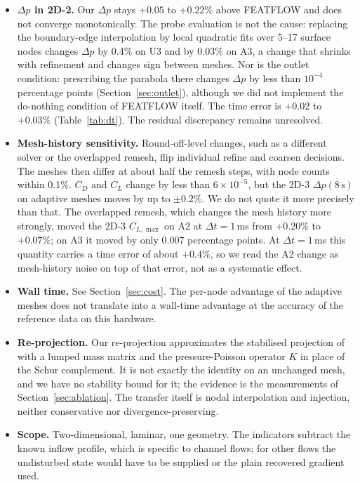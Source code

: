 \documentclass[preprint,12pt,number]{elsarticle}
\newcommand{\dt}{\Delta t}
\begin{document}
\begin{itemize}
\item \textbf{$\Delta p$ in 2D-2.} Our $\Delta p$ stays $+0.05$ to $+0.22\%$ above FEATFLOW
  and does not converge monotonically. The probe evaluation is not the cause: replacing the
  boundary-edge interpolation by local quadratic fits over 5--17 surface nodes changes $\Delta p$
  by 0.4\% on U3 and by 0.03\% on A3, a change that shrinks with refinement and changes sign
  between meshes. Nor is the outlet condition: prescribing the parabola there changes
  $\Delta p$ by less than $10^{-4}$ percentage points (Section~\ref{sec:outlet}), although we
  did not implement the do-nothing condition of FEATFLOW itself. The time error is $+0.02$ to
  $+0.03\%$ (Table~\ref{tab:dt}). The residual discrepancy remains unresolved.
\item \textbf{Mesh-history sensitivity.} Round-off-level changes, such as a different solver
  or the overlapped remesh, flip individual refine and coarsen decisions. The meshes then
  differ at about half the remesh steps, with node counts within 0.1\%. $C_D$ and $C_L$ change
  by less than $6\times10^{-5}$, but the 2D-3 $\Delta p(8\,\mathrm{s})$ on adaptive meshes
  moves by up to $\pm0.2\%$. We do not quote it more precisely than that. The overlapped
  remesh, which changes the mesh history more strongly, moved the 2D-3 $C_{L,\max}$ on A2 at
  $\dt = 1\,$ms from $+0.20\%$ to $+0.07\%$; on A3 it moved by only 0.007 percentage points.
  At $\dt = 1\,$ms this quantity carries a time error of about $+0.4\%$, so we read the A2 change
  as mesh-history noise on top of that error, not as a systematic effect.
\item \textbf{Wall time.} See Section~\ref{sec:cost}. The per-node advantage of the adaptive
  meshes does not translate into a wall-time advantage at the accuracy of the reference data
  on this hardware.
\item \textbf{Re-projection.} Our re-projection approximates the stabilised projection of
  \citet{braack2013} with a lumped mass matrix and the pressure-Poisson operator $K$ in place
  of the Schur complement. It is not exactly the identity on
  an unchanged mesh, and we have no stability bound for it; the evidence is the measurements of
  Section~\ref{sec:ablation}. The transfer itself is nodal interpolation and injection, neither
  conservative nor divergence-preserving.
\item \textbf{Scope.} Two-dimensional, laminar, one geometry. The indicators subtract the known
  inflow profile, which is specific to channel flows; for other flows the undisturbed state
  would have to be supplied or the plain recovered gradient used.
\end{itemize}
\end{document}

